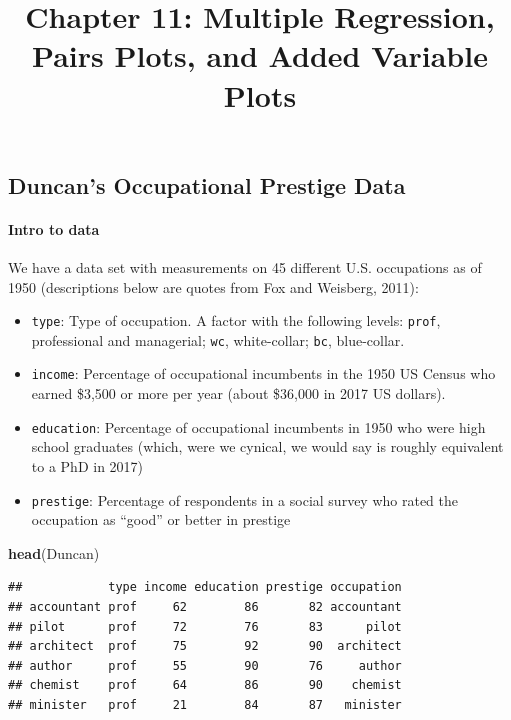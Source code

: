 \documentclass[]{extarticle}
\title{Chapter 11: Multiple Regression, Pairs Plots, and Added Variable Plots}
\author{}
\date{}
\newenvironment{Shaded}{\begin{snugshade}}{\end{snugshade}}
\newcommand{\KeywordTok}[1]{\textcolor[rgb]{0.13,0.29,0.53}{\textbf{#1}}}
\newcommand{\NormalTok}[1]{#1}
\providecommand{\tightlist}{%
  \setlength{\itemsep}{0pt}\setlength{\parskip}{0pt}}
\let\oldparagraph\paragraph
\renewcommand{\paragraph}[1]{\oldparagraph{#1}\mbox{}}
\begin{document}
\maketitle

\subsection{Duncan's Occupational Prestige
Data}\label{duncans-occupational-prestige-data}

\paragraph{Intro to data}\label{intro-to-data}

We have a data set with measurements on 45 different U.S. occupations as
of 1950 (descriptions below are quotes from Fox and Weisberg, 2011):

\begin{itemize}
\tightlist
\item
  \texttt{type}: Type of occupation. A factor with the following levels:
  \texttt{prof}, professional and managerial; \texttt{wc}, white-collar;
  \texttt{bc}, blue-collar.
\item
  \texttt{income}: Percentage of occupational incumbents in the 1950 US
  Census who earned \$3,500 or more per year (about \$36,000 in 2017 US
  dollars).
\item
  \texttt{education}: Percentage of occupational incumbents in 1950 who
  were high school graduates (which, were we cynical, we would say is
  roughly equivalent to a PhD in 2017)
\item
  \texttt{prestige}: Percentage of respondents in a social survey who
  rated the occupation as ``good'' or better in prestige
\end{itemize}

\begin{Shaded}
\begin{Highlighting}[]
\KeywordTok{head}\NormalTok{(Duncan)}
\end{Highlighting}
\end{Shaded}

\begin{verbatim}
##            type income education prestige occupation
## accountant prof     62        86       82 accountant
## pilot      prof     72        76       83      pilot
## architect  prof     75        92       90  architect
## author     prof     55        90       76     author
## chemist    prof     64        86       90    chemist
## minister   prof     21        84       87   minister
\end{verbatim}
\end{document}
